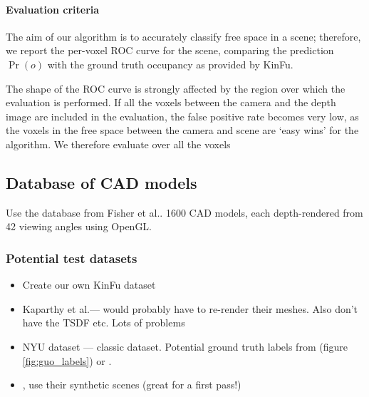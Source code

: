 \documentclass[10pt,twocolumn,letterpaper]{article}
\makeatletter
\newcommand*{\ea}{et al.\@\xspace}
\makeatother
\begin{document}
\paragraph{Evaluation criteria}
The aim of our algorithm is to accurately classify free space in a scene; therefore, we report the per-voxel ROC curve for the scene, comparing the prediction $\Pr(o)$ with the ground truth occupancy as provided by KinFu.

The shape of the ROC curve is strongly affected by the region over which the evaluation is performed.
If all the voxels between the camera and the depth image are included in the evaluation, the false positive rate becomes very low, as the voxels in the free space between the camera and scene are `easy wins' for the algorithm. We therefore evaluate over all the voxels 




\subsection{Database of CAD models}
Use the database from Fisher \ea \cite{fisher-siggraphasia-2012}.
1600 CAD models, each depth-rendered from 42 viewing angles using OpenGL.

\subsubsection{Potential test datasets}
\begin{itemize}
\item Create our own KinFu dataset
\item Kaparthy \ea --- would probably have to re-render their meshes.
Also don't have the TSDF etc. Lots of problems
\item NYU dataset --- classic dataset. Potential ground truth labels from \cite{guo-iccv-2013} (figure \ref{fig:guo_labels}) or \cite{kim-iccv-2013}.
\item \cite{fisher-siggraphasia-2012}, use their synthetic scenes (great for a first pass!)
\end{itemize}

\end{document}
